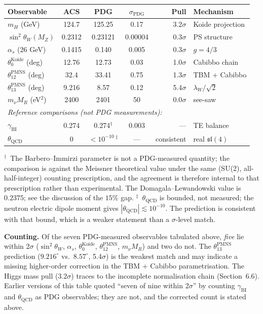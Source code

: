 \documentclass[11pt,a4paper]{article}
\theoremstyle{plain}
\theoremstyle{definition}
\theoremstyle{remark}
\begin{document}
\begin{center}
\begin{tabular}{lcccrl}
\toprule
Observable & ACS & PDG & $\sigma_{\mathrm{PDG}}$ & Pull & Mechanism \\
\midrule
$m_H$ (GeV)                  & 124.7     & 125.25     & 0.17     & 3.2$\sigma$ & Koide projection \\
$\sin^2\theta_W(M_Z)$        & 0.2312    & 0.23121    & 0.00004  & 0.3$\sigma$ & PS structure \\
$\alpha_s$ (26 GeV)           & 0.1415    & 0.140      & 0.005    & 0.3$\sigma$ & $g = 4/3$ \\
$\theta_0^{\mathrm{Koide}}$ (deg) & 12.76 & 12.73     & 0.03     & 1.0$\sigma$ & Cabibbo chain \\
$\theta_{12}^{\mathrm{PMNS}}$ (deg) & 32.4 & 33.41   & 0.75     & 1.3$\sigma$ & TBM + Cabibbo \\
$\theta_{13}^{\mathrm{PMNS}}$ (deg) & 9.216 & 8.57   & 0.12     & 5.4$\sigma$ & $\lambda_W/\sqrt{2}$ \\
$m_\nu M_R$ (eV$^2$)         & 2400      & 2401       & 50       & 0.0$\sigma$ & see-saw \\
\midrule
\multicolumn{6}{l}{\footnotesize\itshape Reference comparisons (not PDG measurements):} \\
$\gamma_{\mathrm{BI}}$       & 0.274     & 0.274$^{\dagger}$ & 0.003 & --- & TE balance \\
$\theta_{\mathrm{QCD}}$      & 0         & $<10^{-10}\,^{\ddagger}$ & --- & consistent & real $\mathfrak{sl}(4)$ \\
\bottomrule
\end{tabular}
\end{center}

\noindent
$^{\dagger}$~The Barbero--Immirzi parameter is not a PDG-measured quantity; the
comparison is against the Meissner theoretical value under the same (SU(2),
all-half-integer) counting prescription, and the agreement is therefore
internal to that prescription rather than experimental.  The
Domagala--Lewandowski value is $0.2375$; see the discussion of the $15\%$ gap.
$^{\ddagger}$~$\theta_{\mathrm{QCD}}$ is bounded, not measured; the neutron
electric dipole moment gives $|\theta_{\mathrm{QCD}}| \lesssim 10^{-10}$.  The
prediction is consistent with that bound, which is a weaker statement than a
$\sigma$-level match.

\medskip
\noindent
\textbf{Counting.}  Of the seven PDG-measured observables tabulated above,
\emph{five} lie within 2$\sigma$ ($\sin^2\theta_W$, $\alpha_s$,
$\theta_0^{\mathrm{Koide}}$, $\theta_{12}^{\mathrm{PMNS}}$, $m_\nu M_R$) and two
do not.  The $\theta_{13}^{\mathrm{PMNS}}$ prediction ($9.216^\circ$ vs.\
$8.57^\circ$, 5.4$\sigma$) is the weakest match and may indicate a missing
higher-order correction in the TBM + Cabibbo parametrisation.  The Higgs mass
pull ($3.2\sigma$) traces to the incomplete normalisation chain
(Section~6.6).  Earlier versions of this table quoted ``seven of nine within
2$\sigma$'' by counting $\gamma_{\mathrm{BI}}$ and $\theta_{\mathrm{QCD}}$ as
PDG observables; they are not, and the corrected count is stated above.
\end{document}
